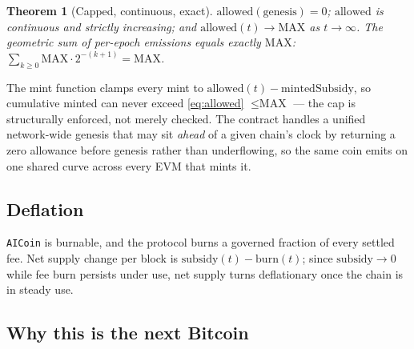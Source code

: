 \documentclass[11pt,a4paper]{article}
\newtheorem{theorem}{Theorem}
\begin{document}
\begin{theorem}[Capped, continuous, exact]\label{thm:cap}
$\text{allowed}(\text{genesis}) = 0$; $\text{allowed}$ is continuous and strictly increasing; and $\text{allowed}(t) \to \text{MAX}$ as $t \to \infty$. The geometric sum of per-epoch emissions equals exactly $\text{MAX}$: $\sum_{k \ge 0} \text{MAX}\cdot 2^{-(k+1)} = \text{MAX}$.
\end{theorem}

The mint function clamps every mint to $\text{allowed}(t) - \text{mintedSubsidy}$, so cumulative minted can never exceed \eqref{eq:allowed} $\le \text{MAX}$ --- the cap is structurally enforced, not merely checked. The contract handles a unified network-wide genesis that may sit \emph{ahead} of a given chain's clock by returning a zero allowance before genesis rather than underflowing, so the same coin emits on one shared curve across every EVM that mints it.

\subsection{Deflation}

\texttt{AICoin} is burnable, and the protocol burns a governed fraction of every settled fee. Net supply change per block is $\text{subsidy}(t) - \text{burn}(t)$; since $\text{subsidy} \to 0$ while fee burn persists under use, net supply turns deflationary once the chain is in steady use.

\subsection{Why this is the next Bitcoin}
\end{document}
